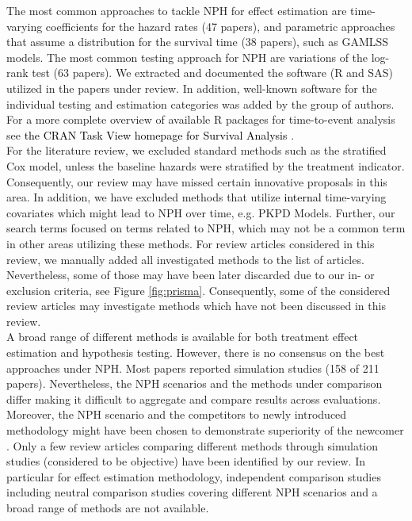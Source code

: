 \documentclass{article}
\newcommand{\NEW}[2][black]{\textcolor{#1}{#2}}
\begin{document}
The most common approaches to tackle NPH for effect estimation are time-varying coefficients for the hazard rates (47 papers), and parametric approaches that assume a distribution for the survival time (38 papers), such as GAMLSS models.
The most common testing approach for NPH are variations of the log-rank test (63 papers).
We extracted and documented the software (R and SAS) utilized in the papers under review.
In addition, well-known software for the individual testing and estimation categories was added by the group of authors.
For a more complete overview of available R packages for time-to-event analysis see \NEW{the CRAN Task View homepage for Survival Analysis} \cite{Allignol.2022}. 
\\
\noindent
For the literature review, we excluded standard methods such as the stratified Cox model, 
unless the baseline hazards were stratified by the treatment indicator. Consequently, our review may have missed certain innovative proposals in this area. In addition, we have excluded methods that utilize \NEW{internal \cite[p.198]{Kalbfleisch.2002}} %
time-varying covariates which might lead to NPH over time, e.g. PKPD Models. Further, our search terms focused on terms related to NPH, which may not be a common term in other areas utilizing these methods. 
For review articles considered in this review, we manually added all investigated methods to the list of articles. Nevertheless, some of those may have been later discarded due to our in- or exclusion criteria, see Figure \ref{fig:prisma}. Consequently, some of the considered review articles may investigate methods which have not been discussed in this review.
\\
\noindent
A broad range of different methods is available for both treatment effect estimation and hypothesis testing.
However, there is no consensus on the best approaches under NPH.
Most papers reported simulation studies (158 of 211 papers). Nevertheless, the NPH scenarios and the methods under comparison differ making it difficult to aggregate and compare results across evaluations. Moreover, the NPH scenario and the competitors to newly introduced methodology might have been chosen to demonstrate superiority of the newcomer \cite{Boulesteix.2020}.
Only a few review articles comparing
different methods through simulation studies (considered to be objective) have
been identified by our review.
In particular for effect estimation methodology, independent comparison studies including neutral comparison studies covering
different NPH scenarios and a broad range of methods are not available.
\end{document}
